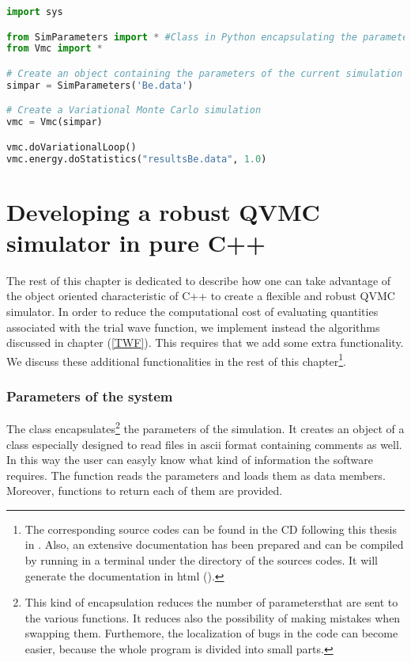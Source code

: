 \begin{lstlisting}[language=Python]
import sys

from SimParameters import * #Class in Python encapsulating the parameters
from Vmc import *

# Create an object containing the parameters of the current simulation
simpar = SimParameters('Be.data')

# Create a Variational Monte Carlo simulation
vmc = Vmc(simpar)

vmc.doVariationalLoop()
vmc.energy.doStatistics("resultsBe.data", 1.0)
\end{lstlisting}

\section{Developing a robust QVMC simulator in pure C++}
The rest of this chapter is dedicated to describe how one can take advantage of the object oriented characteristic of C++ to create a flexible and robust QVMC simulator. In order to reduce the computational cost of evaluating quantities associated with the trial wave function, we implement instead the algorithms discussed in chapter (\ref{TWF}).
This requires that we add some extra functionality. We discuss these additional functionalities 
in the rest of this chapter\footnote{The corresponding source codes can be found in the CD following this thesis in . Also, an extensive documentation has been prepared and can be compiled by running  in a terminal under the directory of the sources codes. It will generate the documentation in html ().}.\\

\subsubsection{Parameters of the system}
The  class encapsulates\footnote{This kind of encapsulation reduces the number of parametersthat are sent to the various functions. It reduces also the possibility of making mistakes when swapping them. Furthemore, the localization of bugs in the code can become easier, because the whole program is divided into small parts.} the parameters of the simulation. It creates an object of a class especially designed to read files in ascii format containing comments as well. In this way the user can easyly know what kind of information the software requires. The function  reads the parameters and loads them as data members. Moreover, functions to return each of them are provided.

